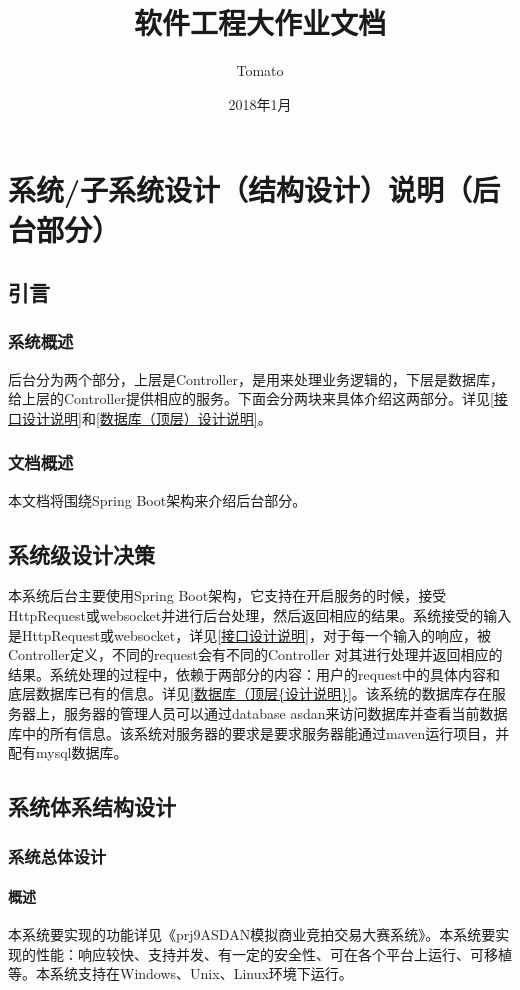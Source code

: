 \documentclass{article}
\title{软件工程大作业文档}
\author{Tomato}
\date{2018年1月}
\begin{document}
\maketitle
\section{系统/子系统设计（结构设计）说明（后台部分）}
\subsection{引言}
\subsubsection{系统概述}
后台分为两个部分，上层是Controller，是用来处理业务逻辑的，下层是数据库，给上层的Controller提供相应的服务。下面会分两块来具体介绍这两部分。详见\ref{接口设计说明}和\ref{数据库（顶层）设计说明}。

\subsubsection{文档概述}
本文档将围绕Spring Boot架构来介绍后台部分。
\subsection{系统级设计决策}
本系统后台主要使用Spring Boot架构，它支持在开启服务的时候，接受HttpRequest或websocket并进行后台处理，然后返回相应的结果。系统接受的输入是HttpRequest或websocket，详见\ref{接口设计说明}，对于每一个输入的响应，被Controller定义，不同的request会有不同的Controller 对其进行处理并返回相应的结果。系统处理的过程中，依赖于两部分的内容：用户的request中的具体内容和底层数据库已有的信息。详见\ref{数据库（顶层{设计说明}}。该系统的数据库存在服务器上，服务器的管理人员可以通过database asdan来访问数据库并查看当前数据库中的所有信息。该系统对服务器的要求是要求服务器能通过maven运行项目，并配有mysql数据库。
\subsection{系统体系结构设计}
\subsubsection{系统总体设计}
\paragraph{概述}
	本系统要实现的功能详见《prj9ASDAN模拟商业竞拍交易大赛系统》。本系统要实现的性能：响应较快、支持并发、有一定的安全性、可在各个平台上运行、可移植等。本系统支持在Windows、Unix、Linux环境下运行。
\end{document}

